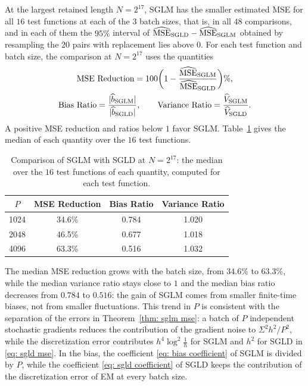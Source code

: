 At the largest retained length $N = 2^{17}$, SGLM has the smaller estimated MSE for all $16$ test functions at each of the $3$ batch sizes, that is, in all $48$ comparisons, and in each of them the $95\%$ interval of $\widehat{\mathrm{MSE}}_{\mathrm{SGLD}} - \widehat{\mathrm{MSE}}_{\mathrm{SGLM}}$ obtained by resampling the $20$ pairs with replacement lies above $0$. For each test function and batch size, the comparison at $N = 2^{17}$ uses the quantities
\begin{gather*}
    \text{MSE Reduction} = 100 \biggl( 1 - \frac{\widehat{\mathrm{MSE}}_{\mathrm{SGLM}}}{\widehat{\mathrm{MSE}}_{\mathrm{SGLD}}} \biggr) \% , \\
    \text{Bias Ratio} = \frac{|\widehat b_{\mathrm{SGLM}}|}{|\widehat b_{\mathrm{SGLD}}|} , \qquad
    \text{Variance Ratio} = \frac{\widehat V_{\mathrm{SGLM}}}{\widehat V_{\mathrm{SGLD}}} .
\end{gather*}
A positive MSE reduction and ratios below $1$ favor SGLM. Table~\ref{tab:mnist-endpoint} gives the median of each quantity over the $16$ test functions.

\begin{table}[htb]
	\centering
	\small
	\begin{tabular}{cccc}
		\toprule
		$P$ & MSE Reduction & Bias Ratio & Variance Ratio \\
		\midrule
		1024 & 34.6\% & 0.784 & 1.020 \\
		2048 & 46.5\% & 0.677 & 1.018 \\
		4096 & 63.3\% & 0.516 & 1.032 \\
		\bottomrule
	\end{tabular}
	\caption{Comparison of SGLM with SGLD at $N = 2^{17}$: the median over the $16$ test functions of each quantity, computed for each test function.}
	\label{tab:mnist-endpoint}
\end{table}

The median MSE reduction grows with the batch size, from $34.6\%$ to $63.3\%$, while the median variance ratio stays close to $1$ and the median bias ratio decreases from $0.784$ to $0.516$: the gain of SGLM comes from smaller finite-time biases, not from smaller fluctuations. This trend in $P$ is consistent with the separation of the errors in Theorem~\ref{thm: sglm mse}: a batch of $P$ independent stochastic gradients reduces the contribution of the gradient noise to $\Sigma^2 h^2 / P^2$, while the discretization error contributes $h^4 \log^2\frac1h$ for SGLM and $h^2$ for SGLD in \eqref{eq: sgld mse}. In the bias, the coefficient \eqref{eq: bias coefficient} of SGLM is divided by $P$, while the coefficient \eqref{eq: sgld coefficient} of SGLD keeps the contribution of the discretization error of EM at every batch size.